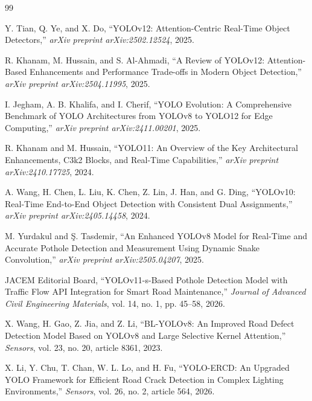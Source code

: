 \documentclass[12pt,a4paper]{article}
\begin{document}
\newpage
\begin{thebibliography}{99}

Y. Tian, Q. Ye, and X. Do,
``YOLOv12: Attention-Centric Real-Time Object Detectors,''
\textit{arXiv preprint arXiv:2502.12524}, 2025.

R. Khanam, M. Hussain, and S. Al-Ahmadi,
``A Review of YOLOv12: Attention-Based Enhancements and Performance Trade-offs in Modern Object Detection,''
\textit{arXiv preprint arXiv:2504.11995}, 2025.

I. Jegham, A. B. Khalifa, and I. Cherif,
``YOLO Evolution: A Comprehensive Benchmark of YOLO Architectures from YOLOv8 to YOLO12 for Edge Computing,''
\textit{arXiv preprint arXiv:2411.00201}, 2025.

R. Khanam and M. Hussain,
``YOLO11: An Overview of the Key Architectural Enhancements, C3k2 Blocks, and Real-Time Capabilities,''
\textit{arXiv preprint arXiv:2410.17725}, 2024.

A. Wang, H. Chen, L. Liu, K. Chen, Z. Lin, J. Han, and G. Ding,
``YOLOv10: Real-Time End-to-End Object Detection with Consistent Dual Assignments,''
\textit{arXiv preprint arXiv:2405.14458}, 2024.

M. Yurdakul and \c{S}. Tasdemir,
``An Enhanced YOLOv8 Model for Real-Time and Accurate Pothole Detection and Measurement Using Dynamic Snake Convolution,''
\textit{arXiv preprint arXiv:2505.04207}, 2025.

JACEM Editorial Board,
``YOLOv11-s-Based Pothole Detection Model with Traffic Flow API Integration for Smart Road Maintenance,''
\textit{Journal of Advanced Civil Engineering Materials}, vol. 14, no. 1, pp. 45--58, 2026.

X. Wang, H. Gao, Z. Jia, and Z. Li,
``BL-YOLOv8: An Improved Road Defect Detection Model Based on YOLOv8 and Large Selective Kernel Attention,''
\textit{Sensors}, vol. 23, no. 20, article 8361, 2023.

X. Li, Y. Chu, T. Chan, W. L. Lo, and H. Fu,
``YOLO-ERCD: An Upgraded YOLO Framework for Efficient Road Crack Detection in Complex Lighting Environments,''
\textit{Sensors}, vol. 26, no. 2, article 564, 2026.


\end{thebibliography}
\end{document}
